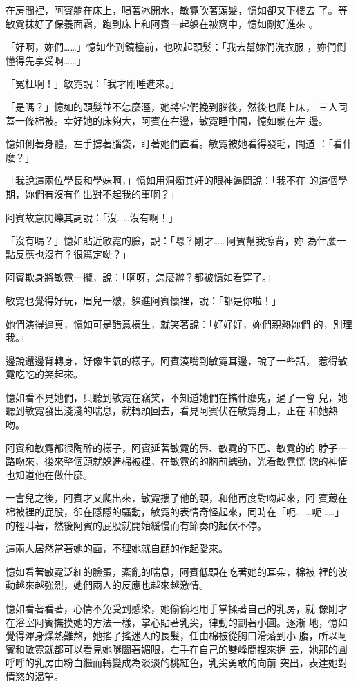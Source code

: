 在房間裡，阿賓躺在床上，喝著冰開水，敏霓吹著頭髮，憶如卻又下樓去
了。等敏霓抹好了保養面霜，跑到床上和阿賓一起躲在被窩中，憶如剛好進來
。

「好啊，妳們……」憶如坐到鏡檯前，也吹起頭髮：「我去幫妳們洗衣服
，妳們倒懂得先享受啊……」

「冤枉啊！」敏霓說：「我才剛睡進來。」

「是嗎？」憶如的頭髮並不怎麼溼，她將它們挽到腦後，然後也爬上床，
三人同蓋一條棉被。幸好她的床夠大，阿賓在右邊，敏霓睡中間，憶如躺在左
邊。

憶如側著身體，左手撐著腦袋，盯著她們直看。敏霓被她看得發毛，問道
：「看什麼？」

「我說這兩位學長和學妹啊，」憶如用洞燭其奸的眼神逼問說：「我不在
的這個學期，妳們有沒有作出對不起我的事啊？」

阿賓故意閃爍其詞說：「沒……沒有啊！」

「沒有嗎？」憶如貼近敏霓的臉，說：「嗯？剛才……阿賓幫我擦背，妳
為什麼一點反應也沒有？很篤定呦？」

阿賓欺身將敏霓一攬，說：「啊呀，怎麼辦？都被憶如看穿了。」

敏霓也覺得好玩，眉兒一皺，躲進阿賓懷裡，說：「都是你啦！」

她們演得逼真，憶如可是醋意橫生，就笑著說：「好好好，妳們親熱妳們
的，別理我。」

邊說還邊背轉身，好像生氣的樣子。阿賓湊嘴到敏霓耳邊，說了一些話，
惹得敏霓吃吃的笑起來。

憶如看不見她們，只聽到敏霓在竊笑，不知道她們在搞什麼鬼，過了一會
兒，她聽到敏霓發出淺淺的喘息，就轉頭回去，看見阿賓伏在敏霓身上，正在
和她熱吻。

阿賓和敏霓都很陶醉的樣子，阿賓延著敏霓的唇、敏霓的下巴、敏霓的的
脖子一路吻來，後來整個頭就躲進棉被裡，在敏霓的的胸前蠕動，光看敏霓恍
惚的神情也知道他在做什麼。

一會兒之後，阿賓才又爬出來，敏霓摟了他的頸，和他再度對吻起來，阿
賓藏在棉被裡的屁股，卻在隱隱的騷動，敏霓的表情奇怪起來，同時在「呃…
…呃……」的輕叫著，然後阿賓的屁股就開始緩慢而有節奏的起伏不停。

這兩人居然當著她的面，不理她就自顧的作起愛來。

憶如看著敏霓泛紅的臉蛋，紊亂的喘息，阿賓低頭在吃著她的耳朵，棉被
裡的波動越來越強烈，她們兩人的反應也越來越激情。

憶如看著看著，心情不免受到感染，她偷偷地用手掌揉著自己的乳房，就
像剛才在浴室阿賓撫摸她的方法一樣，掌心貼著乳尖，律動的劃著小圓。逐漸
地，憶如覺得渾身燥熱難熬，她搖了搖迷人的長髮，任由棉被從胸口滑落到小
腹，所以阿賓和敏霓就都可以看見她瞇闔著媚眼，右手在自己的雙峰間捏來握
去，她那的圓呼呼的乳房由粉白繼而轉變成為淡淡的桃紅色，乳尖勇敢的向前
突出，表達她對情慾的渴望。

